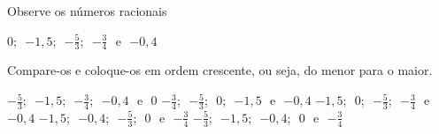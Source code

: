 Observe os números racionais

\vspace{-4mm}\begin{center}
$0$;\,\, $-1{,}5$;\,\, $-\frac{5}{3}$;\,\, $-\frac{3}{4}$\,\, e\,\, $-0{,}4$

\end{center}\vspace{-4mm}
Compare-os e coloque-os em ordem crescente, ou seja, do menor para o maior.

$-\frac{5}{3}$;\,\, $-1{,}5$;\,\, $-\frac{3}{4}$;\,\, $-0{,}4$\,\, e\,\, $0$
$-\frac{3}{4}$;\,\, $-\frac{5}{3}$;\,\, $0$;\,\, $-1{,}5$\,\, e\,\, $-0{,}4$
$-1{,}5$;\,\, $0$;\,\, $-\frac{5}{3}$;\,\, $-\frac{3}{4}$\,\, e\,\, $-0{,}4$
$-1{,}5$;\,\, $-0{,}4$;\,\, $-\frac{5}{3}$;\,\, $0$\,\, e\,\, $-\frac{3}{4}$
$-\frac{5}{3}$;\,\, $-1{,}5$;\,\, $-0{,}4$;\,\, $0$\,\, e\,\, $-\frac{3}{4}$



